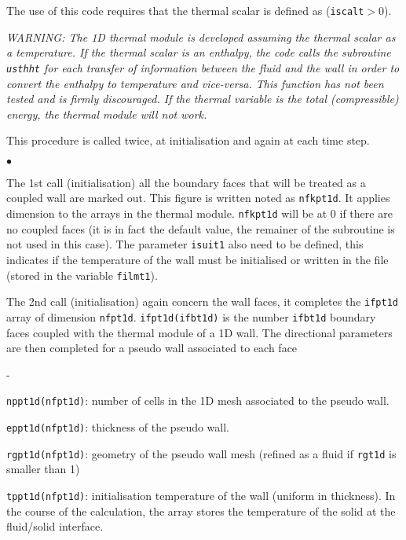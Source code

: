 {{The use of this code requires that the thermal scalar is
defined as (\texttt{iscalt}$>0$).

{\em WARNING: The 1D thermal module is developed assuming the thermal scalar
 as a temperature. If the thermal scalar is an enthalpy, the code calls the
 subroutine \texttt{usthht} for each transfer of information between the fluid
 and the wall in order to convert the enthalpy to temperature and vice-versa.
 This function has not been tested and is firmly discouraged. If the thermal
 variable is the total (compressible) energy, the thermal module will not work.}

\bigskip

This procedure  is called twice, at initialisation and again at each time step.

\begin{list}{$\bullet$}{}
\item The 1st call (initialisation) all the boundary faces that will be treated
 as a coupled wall are marked out. This figure is written noted as
 \texttt{nfkpt1d}. It applies dimension to the arrays in the thermal module.
 \texttt{nfkpt1d} will be at 0 if there are no coupled faces (it is in fact the
 default value, the remainer of the subroutine is not used in this case).
 The parameter \texttt{isuit1} also need to be defined, this indicates if the
 temperature of the wall must be initialised or written in the file (stored in
 the variable \texttt{filmt1}).
\item The 2nd call (initialisation) again concern the wall faces, it completes
 the \texttt{ifpt1d} array of dimension \texttt{nfpt1d}.
 \mbox{\texttt{ifpt1d(ifbt1d)}} is the number
 \texttt{ifbt1d}\raisebox{1ex}{\small th} boundary faces coupled with the thermal module
 of a 1D wall. The directional parameters are then completed for a pseudo
 wall associated to each face
\begin{list}{-}{}
\item \texttt{nppt1d(nfpt1d)}: number of cells in the 1D mesh associated
 to the pseudo wall.
\item \texttt{eppt1d(nfpt1d)}: thickness of the pseudo wall.
\item \texttt{rgpt1d(nfpt1d)}: geometry of the pseudo wall mesh (refined
 as a fluid if \texttt{rgt1d} is smaller than 1)
\item \texttt{tppt1d(nfpt1d)}: initialisation temperature of the wall
(uniform in thickness). In the course of the calculation, the array stores the
 temperature of the solid at the fluid/solid interface.
\end{list}


\end{list}}}
